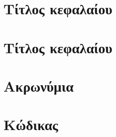 \documentclass{uowmthesis}
\begin{document}



% 
% 

% 
% 




% 






\listoftables \newpage
\listoffigures \newpage
\listofalgorithms
\listofimages

\tableofcontents


\chapter{Τίτλος κεφαλαίου}



\chapter{Τίτλος κεφαλαίου}




\appendix
\chapter{Ακρωνύμια}


\chapter{Κώδικας}



\chapter*{\bibname}
\printbibliography[heading=none]
\end{document}
